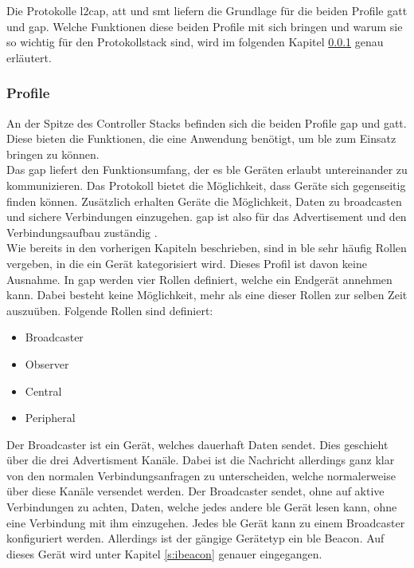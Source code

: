 \noindent Die Protokolle \ac{l2cap}, \ac{att} und \ac{smt} liefern die Grundlage für die beiden Profile \ac{gatt} und \ac{gap}. Welche Funktionen diese beiden Profile mit sich bringen und warum sie so wichtig für den Protokollstack sind, wird im folgenden Kapitel \ref{sss:funktionsweise:profiles} genau erläutert.\\

\subsubsection{Profile}
\label{sss:funktionsweise:profiles}

An der Spitze des Controller Stacks befinden sich die beiden Profile \ac{gap} und \ac{gatt}. Diese bieten die Funktionen, die eine Anwendung benötigt, um \ac{ble} zum Einsatz bringen zu können.\\

\noindent Das \ac{gap} liefert den Funktionsumfang, der es \ac{ble} Geräten erlaubt untereinander zu kommunizieren. Das Protokoll bietet die Möglichkeit, dass Geräte sich gegenseitig finden können. Zusätzlich erhalten Geräte die Möglichkeit, Daten zu broadcasten und sichere Verbindungen einzugehen. \ac{gap} ist also für das Advertisement und den Verbindungsaufbau zuständig \cite[Seite 33]{Townsend14:GSB}.\\

\noindent Wie bereits in den vorherigen Kapiteln beschrieben, sind in \ac{ble} sehr häufig Rollen vergeben, in die ein Gerät kategorisiert wird. Dieses Profil ist davon keine Ausnahme. In \ac{gap} werden vier Rollen definiert, welche ein Endgerät annehmen kann. Dabei besteht keine Möglichkeit, mehr als eine dieser Rollen zur selben Zeit auszuüben. Folgende Rollen sind definiert:
\begin{itemize}
	\item{Broadcaster}
	\item{Observer}
	\item{Central}
	\item{Peripheral}
\end{itemize}     

\noindent Der Broadcaster ist ein Gerät, welches dauerhaft Daten sendet. Dies geschieht über die drei Advertisment Kanäle. Dabei ist die Nachricht allerdings ganz klar von den normalen Verbindungsanfragen zu unterscheiden, welche normalerweise über diese Kanäle versendet werden. Der Broadcaster sendet, ohne auf aktive Verbindungen zu achten, Daten, welche jedes andere \ac{ble} Gerät lesen kann, ohne eine Verbindung mit ihm einzugehen. Jedes \ac{ble} Gerät kann zu einem Broadcaster konfiguriert werden. Allerdings ist der gängige Gerätetyp ein \ac{ble} Beacon. Auf dieses Gerät wird unter Kapitel \ref{s:ibeacon} genauer eingegangen.\\ 

